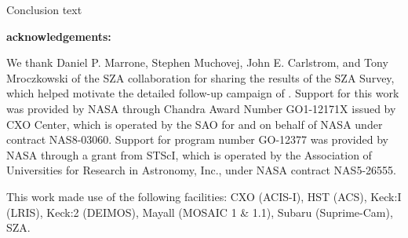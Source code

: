 Conclusion text

\textbf{acknowledgements:}

We thank Daniel P. Marrone, Stephen Muchovej,  John E. Carlstrom, and Tony Mroczkowski of the SZA collaboration for sharing the results of the SZA Survey, which helped motivate the detailed follow-up campaign of . 
Support for this work was provided by NASA through Chandra Award Number GO1-12171X issued by CXO Center, which is operated by the SAO for and on behalf of NASA under contract NAS8-03060.  Support for program number GO-12377 was provided by NASA through a grant from STScI, which is operated by the Association of Universities for Research in Astronomy, Inc., under NASA contract NAS5-26555.

This work made use of the following facilities: CXO (ACIS-I), HST (ACS), Keck:I (LRIS), Keck:2 (DEIMOS), Mayall (MOSAIC 1 \& 1.1), Subaru (Suprime-Cam), SZA.
